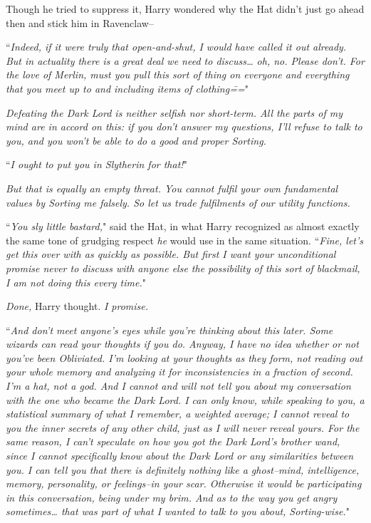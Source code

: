 Though he tried to suppress it, Harry wondered why the Hat didn't just go ahead then and stick him in Ravenclaw\---

``\emph{Indeed, if it were truly that open-and-shut, I would have called it out already. But in actuality there is a great deal we need to discuss{\ldots} oh, no. Please don't. For the love of Merlin, \emph{must} you pull this sort of thing on everyone and everything that you meet up to and including items of clothing\===}"

\emph{Defeating the Dark Lord is neither selfish nor short-term. All the parts of my mind are in accord on this: if you don't answer my questions, I'll refuse to talk to you, and you won't be able to do a good and proper Sorting.}

``\emph{I ought to put you in Slytherin for that!}"

\emph{But that is \emph{equally} an empty threat. You cannot fulfil your own fundamental values by Sorting me falsely. So let us trade fulfilments of our utility functions.}

``\emph{You sly little bastard,}" said the Hat, in what Harry recognized as almost exactly the same tone of grudging respect \emph{he} would use in the same situation. ``\emph{Fine, let's get this over with as quickly as possible. But first I want your unconditional promise never to discuss with anyone else the possibility of this sort of blackmail, I am \emph{not} doing this every time.}"

\emph{Done,} Harry thought. \emph{I promise.}

``\emph{And don't meet anyone's eyes while you're thinking about this later. Some wizards can read your thoughts if you do. Anyway, I have no idea whether or not you've been Obliviated. I'm looking at your thoughts as they form, not reading out your whole memory and analyzing it for inconsistencies in a fraction of second. I'm a hat, not a god. And I cannot and will not tell you about my conversation with the one who became the Dark Lord. I can only \emph{know}, while speaking to you, a statistical summary of what I remember, a weighted average; I \emph{cannot} reveal to you the inner secrets of any other child, just as I will never reveal yours. For the same reason, I can't speculate on how you got the Dark Lord's brother wand, since I cannot specifically know about the Dark Lord or any similarities between you. I \emph{can} tell you that there is definitely nothing like a ghost\---mind, intelligence, memory, personality, or feelings\---in your scar. Otherwise it would be participating in this conversation, being under my brim. And as to the way you get angry sometimes{\ldots} that was part of what I wanted to talk to you about, Sorting-wise.}"

